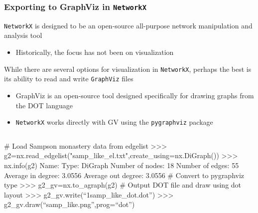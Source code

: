 \documentclass[xcolor=dvipsnames, 9pt]{beamer}
\newenvironment{code}{\begin{semiverbatim} \begin{footnotesize}}
{\end{footnotesize}\end{semiverbatim}}
\begin{document}
\begin{frame}[fragile]
    \frametitle{Exporting to GraphViz in \texttt{NetworkX}}
    \texttt{NetworkX} is designed to be an open-source all-purpose network manipulation and analysis tool
    \begin{itemize}
        \item Historically, the focus has not been on visualization
    \end{itemize}
    While there are several options for visualization in \texttt{NetworkX}, perhaps the best is its ability to read and write \texttt{GraphViz} files
    \begin{itemize}
        \item GraphViz is an open-source tool designed specifically for drawing graphs from the DOT language
        \item \texttt{NetworkX} works directly with GV using the \texttt{pygraphviz} package
    \end{itemize}
    \begin{columns}
        \begin{block}{}
            \begin{code}
\tiny{\alert<2>{# Load Sampson monastery data from edgelist
>>> g2=nx.read_edgelist("samp_like_el.txt",create_using=nx.DiGraph())
>>> nx.info(g2)
Name:                  
Type:                  DiGraph
Number of nodes:       18
Number of edges:       55
Average in degree:     3.0556
Average out degree:    3.0556}
\alert<3>{# Convert to pygraphviz type
>>> g2_gv=nx.to_agraph(g2)}
\alert<4>{# Output DOT file and draw using dot layout
>>> g2_gv.write(``1samp_like_dot.dot'')
>>> g2_gv.draw(``samp_like.png'',prog=``dot'')}}
            \end{code}
        \end{block}
        \begin{center}
        \end{center}
    \end{columns}
\end{frame}
\end{document}
